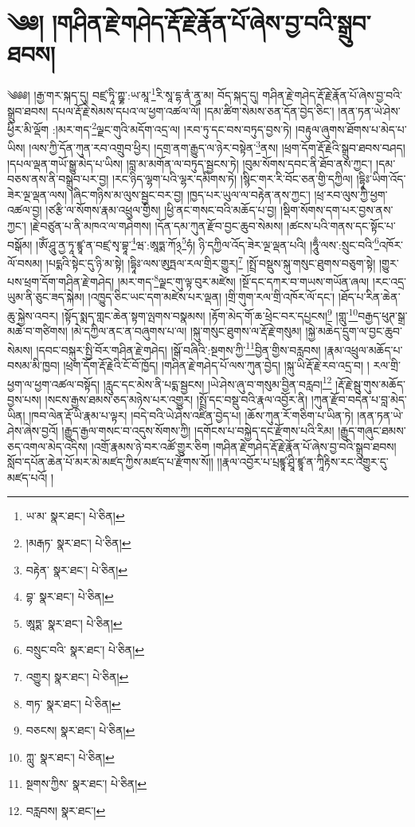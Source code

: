 \setcounter{footnote}{0} 
\chapter{༄༅། །གཤིན་རྗེ་གཤེད་རྡོ་རྗེ་རྣོན་པོ་ཞེས་བྱ་བའི་སྒྲུབ་ཐབས།}༄༅༅། །རྒྱ་གར་སྐད་དུ། བཛྲ་ཏཱི་ཀྵྞ་:ཡ་མཱ་\footnote{ཡ་མ་  སྣར་ཐང་།  པེ་ཅིན། }རི་སཱ་དྷ་ནཾ་ནཱ་མ། བོད་སྐད་དུ། གཤིན་རྗེ་གཤེད་རྡོ་རྗེ་རྣོན་པོ་ཞེས་བྱ་བའི་སྒྲུབ་ཐབས། དཔལ་རྡོ་རྗེ་སེམས་དཔའ་ལ་ཕྱག་འཚལ་ལོ། །དམ་ཚིག་སེམས་ཅན་དོན་བྱེད་ཅིང་། །ནན་ཏན་ཡེ་ཤེས་ཕྱིར་མི་ལྡོག :།མར་གད་\footnote{།མརྒཏ་  སྣར་ཐང་།  པེ་ཅིན། }ལྗང་གུའི་མདོག་འདྲ་ལ། །རབ་ཏུ་དང་བས་བཏུད་བྱས་ཏེ། །བརྟུལ་ཞུགས་ཐོགས་པ་མེད་པ་ཡིས། །ལས་ཀྱི་དོན་ཀུན་རབ་འགྲུབ་ཕྱིར། །དགྲ་ནག་རྒྱུད་ལ་ཉེར་བསྟེན་\footnote{བརྟེན་  སྣར་ཐང་།  པེ་ཅིན། }ནས། །ཕྲག་དོག་རྡོ་རྗེའི་སྒྲུབ་ཐབས་བཤད། །དཔལ་ལྡན་གཡོ་སྒྱུ་མེད་པ་ཡིས། །བླ་མ་མགོན་ལ་བཏུད་སྦྱངས་ཏེ། །བུམ་སོགས་དབང་ནི་ཐོབ་ནས་ཀྱང་། །དམ་བཅས་ནས་ནི་བསྒྲུབ་པར་བྱ། །རང་ཉིད་ལྷག་པའི་ལྷར་དམིགས་ཏེ། །སྙིང་གར་རི་བོང་ཅན་གྱི་དཀྱིལ། །དྷཱིཿ་ཡིག་འོད་ཟེར་ལྔ་ལྡན་ལས། །ཞིང་གཉིས་མ་ལུས་སྦྱང་བར་བྱ། །ཁྱད་པར་ཡུལ་ལ་བརྟེན་ནས་ཀྱང་། །ཕྲ་རབ་ལུས་ཀྱི་ཕྱག་འཚལ་བྱ། །ཙརྩི་ལ་སོགས་རྣམ་འཕྲུལ་གྱིས། །ཕྱི་ནང་གསང་བའི་མཆོད་པ་བྱ། །སྡིག་སོགས་དག་པར་བྱས་ནས་ཀྱང་། །རྗེ་བཙུན་པ་ནི་མཁའ་ལ་གཤེགས། །དོན་དམ་ཀུན་རྫོབ་བྱང་ཆུབ་སེམས། །ཚངས་པའི་གནས་དང་སྟོང་པ་བསྒོམ། །ཨོཾ་ཤཱུ་ནྱ་ཏཱ་ཛྙཱ་ན་བཛྲ་སྭ་བྷཱ་\footnote{བྷ་  སྣར་ཐང་།  པེ་ཅིན། }ཝ་:ཨཱཏྨ་ཀོ྅\footnote{ཨཱཏྨ་  སྣར་ཐང་།  པེ་ཅིན། }ཧཾ། ཉི་དཀྱིལ་འོད་ཟེར་ལྔ་ལྡན་པའི། །ཧཱུྃ་ལས་:སྲུང་བའི་\footnote{བསྲུང་བའི་  སྣར་ཐང་།  པེ་ཅིན། }འཁོར་ལོ་བསམ། །པདྨའི་སྟེང་དུ་ཉི་མ་སྟེ། །དྷཱིཿ་ལས་ཨུཏྤལ་རལ་གྲིར་གྱུར།\footnote{འགྱུར།  སྣར་ཐང་།  པེ་ཅིན། } །སྤྲོ་བསྡུས་སྐུ་གསུང་ཐུགས་བཅུག་སྟེ། །གྱུར་པས་ཕྲག་དོག་གཤིན་རྗེ་གཤེད། །མར་གད་\footnote{གཏ་  སྣར་ཐང་།  པེ་ཅིན། }ལྗང་གུ་ལྟ་བུར་མཛེས། །སྔོ་དང་དཀར་བ་གཡས་གཡོན་ཞལ། །རང་འདྲ་ཡུམ་ནི་ཅུང་ཟད་སྐེམ། །འཁྱུད་ཅིང་ཡང་དག་མཛེས་པར་ལྡན། །གྲི་གུག་རལ་གྲི་འཁོར་ལོ་དང་། །ཐོད་པ་རིན་ཆེན་ཆུ་སྐྱེས་འབར། །སྟོད་སྨད་གླང་ཆེན་སྟག་ལྤགས་བསྣམས། །རྟོག་མེད་གོ་ཆ་ཕྲེང་བར་དཔྱངས།\footnote{བཅངས།  སྣར་ཐང་།  པེ་ཅིན། } །གླུ་\footnote{ཀླུ་  སྣར་ཐང་།  པེ་ཅིན། }བརྒྱད་ཕུཊ་སྒྲ་མཆེ་བ་གཙིགས། །མེ་དཀྱིལ་ནང་ན་བཞུགས་པ་ལ། །སྐུ་གསུང་ཐུགས་ལ་རྡོ་རྗེ་གསུམ། །སྐྱེ་མཆེད་དྲུག་ལ་བྱང་ཆུབ་སེམས། །དབང་བསྐུར་སྤྱི་བོར་གཤིན་རྗེ་གཤེད། །སྒོ་བཞིའི་:སྔགས་ཀྱི་\footnote{སྔགས་ཀྱིས་  སྣར་ཐང་།  པེ་ཅིན། }བྱིན་གྱིས་བརླབས། །རྣམ་འཕྲུལ་མཆོད་པ་བསམ་མི་ཁྱབ། །ཕྲག་དོག་རྡོ་རྗེའི་ངོ་བོ་ཁྱོད། །གཤིན་རྗེ་གཤེད་པོ་ལས་ཀུན་བྱེད། །སྐུ་ཡི་རྡོ་རྗེ་རབ་འདྲ་བ། །
རལ་གྲི་ཕྱག་ལ་ཕྱག་འཚལ་བསྟོད། །རླུང་དང་མེས་ནི་པདྨ་སྦྱངས། །ཡེ་ཤེས་ཞུ་བ་གསུམ་བྱིན་བརླབ།\footnote{བརླབས།  སྣར་ཐང་། } །རྡོ་རྗེ་སྦུ་གུས་མཆོད་བྱས་པས། །སངས་རྒྱས་ཐམས་ཅད་མཉེས་པར་འགྱུར། །སྤྲོ་དང་བསྡུ་བའི་རྣལ་འབྱོར་ནི། །ཀུན་རྫོབ་བདེན་པ་བླ་མེད་ཡིན། །ཁབ་ལེན་རྡོ་ཡི་རྣམ་པ་ལྟར། །བདེ་བའི་ཡེ་ཤེས་འཛིན་བྱེད་པ། །ཆོས་ཀུན་རོ་གཅིག་པ་ཡིན་ཏེ། །ནན་ཏན་ཡེ་ཤེས་ཞེས་བྱའོ། །རྒྱུད་རྒྱལ་གསང་བ་འདུས་སོགས་ཀྱི། །དགོངས་པ་བསྐྱེད་དང་རྫོགས་པའི་རིམ། །རྒྱུད་གཞུང་ཐམས་ཅད་འགལ་མེད་འདིས། །འགྲོ་རྣམས་ཉེ་བར་འཚོ་གྱུར་ཅིག །གཤིན་རྗེ་གཤེད་རྡོ་རྗེ་རྣོན་པོ་ཞེས་བྱ་བའི་སྒྲུབ་ཐབས། སློབ་དཔོན་ཆེན་པོ་མར་མེ་མཛད་ཀྱིས་མཛད་པ་རྫོགས་སོ།། །།རྣལ་འབྱོར་པ་པྲཛྙཱ་ཤྲཱི་ཛྙཱ་ན་ཀཱིརྟིས་རང་འགྱུར་དུ་མཛད་པའོ། ། 